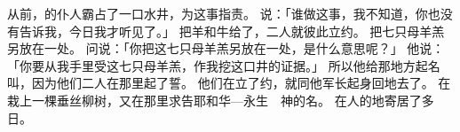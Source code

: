 {\par }{\PP {}从前，{}的仆人霸占了一口水井，{}为这事指责{}。
说：「谁做这事，我不知道，你也没有告诉我，今日我才听见了。」
把羊和牛给了{}，二人就彼此立约。
把七只母羊羔另放在一处。
问{}说：「你把这七只母羊羔另放在一处，是什么意思呢？」
他说：「你要从我手里受这七只母羊羔，作我挖这口井的证据。」
所以他给那地方起名叫{}，因为他们二人在那里起了誓。
他们在{}立了约，{}就同他军长{}起身回{}地去了。
在{}栽上一棵垂丝柳树，又在那里求告耶和华—永生　神的名。
在{}人的地寄居了多日。

}
